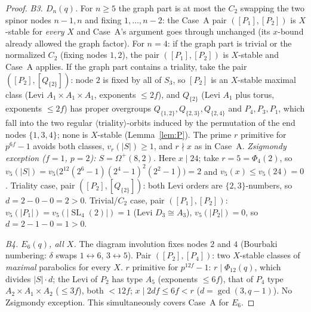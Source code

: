\documentclass[11pt]{amsart}
\theoremstyle{definition}
\theoremstyle{remark}
\DeclareMathOperator{\SL}{SL}
\newcommand{\vp}[1]{v_{#1}}
\begin{document}
\begin{proof}
\emph{B3. $D_n(q)$.} For $n\geq5$ the graph part is at most the $C_2$
swapping the two spinor nodes $n{-}1,n$ and fixing $1,\dots,n{-}2$: the
Case~A pair $([P_1],[P_2])$ is $X$-stable for \emph{every} $X$ and
Case~A's argument goes through unchanged (its $x$-bound already allowed
the graph factor). For $n=4$: if the graph part is trivial or the
normalized $C_2$ (fixing nodes $1,2$), the pair $([P_1],[P_2])$ is
$X$-stable and Case~A applies. If the graph part contains a triality,
take the pair $([P_2],[Q_{\{2\}}])$: node $2$ is fixed by all of $S_3$,
so $[P_2]$ is an $X$-stable maximal class (Levi
$A_1{\times}A_1{\times}A_1$, exponents $\leq2f$), and $Q_{\{2\}}$ (Levi
$A_1$ plus torus, exponents $\leq2f$) has proper overgroups
$Q_{\{1,2\}},Q_{\{2,3\}},Q_{\{2,4\}}$ and $P_4,P_3,P_1$, which fall
into the two regular $\langle\text{triality}\rangle$-orbits induced by
the permutation of the end nodes $\{1,3,4\}$; none is $X$-stable
(Lemma~\ref{lem:P}). The prime $r$ primitive for $p^{6f}-1$ avoids both
classes, $\vp{r}(|S|)\geq1$, and $r\nmid x$ as in Case~A.
\emph{Zsigmondy exception ($f=1$, $p=2$): $S=\Omega^+(8,2)$.} Here
$x\mid24$; take $r=5=\Phi_4(2)$, so
$v_5(|S|)=v_5\bigl(2^{12}(2^6-1)(2^4-1)^2(2^2-1)\bigr)=2$ and
$v_5(x)\leq v_5(24)=0$. Triality case, pair $([P_2],[Q_{\{2\}}])$: both
Levi orders are $\{2,3\}$-numbers, so $d=2-0-0=2>0$. Trivial/$C_2$
case, pair $([P_1],[P_2])$: $v_5(|P_1|)=v_5(|\SL_4(2)|)=1$ (Levi
$D_3\cong A_3$), $v_5(|P_2|)=0$, so $d=2-1-0=1>0$.

\emph{B4. $E_6(q)$, all $X$.} The diagram involution fixes nodes $2$
and $4$ (Bourbaki numbering: $\delta$ swaps $1\leftrightarrow6$,
$3\leftrightarrow5$). Pair $([P_2],[P_4])$: two $X$-stable classes of
\emph{maximal} parabolics for every $X$. $r$ primitive for $p^{12f}-1$:
$r\mid\Phi_{12}(q)$, which divides $|S|\cdot d$; the Levi of $P_2$ has
type $A_5$ (exponents $\leq6f$), that of $P_4$ type
$A_2{\times}A_1{\times}A_2$ ($\leq3f$), both $<12f$; $x\mid2df\leq6f<r$
($d=\gcd(3,q-1)$). No Zsigmondy exception. This simultaneously covers
Case~A for $E_6$.


\end{proof}
\end{document}
